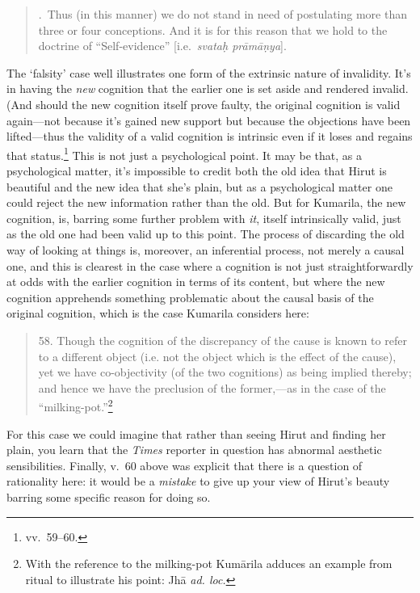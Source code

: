 ﻿\documentclass[11pt]{amsart}
\begin{document}
\begin{quote}
.~Thus (in this manner) we do not stand in need of postulating more than three or four conceptions. And it is for this reason that we hold to the doctrine of ``Self-evidence'' [i.e.~\emph{svata\d h pr\=am\=a\d nya}].\end{quote}\normalsize The `falsity' case well illustrates one form of the extrinsic nature of invalidity. It's in having the \emph{new} cognition that the earlier one is set aside and rendered invalid. (And should the new cognition itself prove faulty, the original cognition is valid again---not because it's gained new support but because the objections have been lifted---thus the validity of a valid cognition is intrinsic even if it loses and regains that status.\footnote{vv.~59--60.} This is not just a psychological point. It may be that, as a psychological matter, it's impossible to credit both the old idea that Hirut is beautiful and the new idea that she's plain, but as a psychological matter one could reject the new information rather than the old. But for Kumarila, the new cognition, is, barring some further problem with \emph{it}, itself intrinsically valid, just as the old one had been valid up to this point. The process of discarding the old way of looking at things is, moreover, an inferential process, not merely a causal one, and this is clearest in the case where a cognition is not just straightforwardly at odds with the earlier cognition in terms of its content, but where the new cognition apprehends something problematic about the causal basis of the original cognition, which is the case Kumarila considers here:\small\begin{quote}58. Though the cognition of the discrepancy of the cause is known to refer to a different object (i.e. not the object which is the effect of the cause), yet we have co-objectivity (of the two cognitions) as being implied thereby; and hence we have the preclusion of the former,---as in the case of the ``milking-pot.''\footnote{With the reference to the milking-pot Kum\=arila adduces an example from ritual to illustrate his point: Jh\=a \emph{ad. loc.}}\end{quote}\normalsize For this case we could imagine that rather than seeing Hirut and finding her plain, you learn that the \emph{Times} reporter in question has abnormal aesthetic sensibilities. Finally, v.~60 above was explicit that there is a question of rationality here: it would be a \emph{mistake} to give up your view of Hirut's beauty barring some specific reason for doing so.
\end{document}
